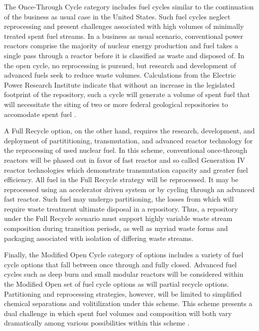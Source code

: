 The Once-Through Cycle category includes fuel cycles similar to the 
continuation of the business as usual case in the United States.
Such fuel cycles neglect reprocessing and present challenges 
associated with high volumes of minimally treated spent fuel streams.  
In a business as usual scenario, 
conventional power reactors comprise the majority of nuclear energy 
production and fuel takes a single pass through a reactor before it is 
classified as waste and disposed of. In the open cycle, no 
reprocessing is pursued, but research and development of advanced 
fuels seek to reduce waste volumes. Calculations from the Electric 
Power Research Institute indicate that without an increase in the legislated 
footprint of the repository, such a cycle will generate a 
volume of spent fuel that will necessitate the siting of two or more 
federal  geological repositories to accomodate spent fuel 
\cite{kessler_room_2006}.  %

A Full Recycle option, on the other hand, requires the research, 
development, and deployment of partititioning, transmutation, and 
advanced reactor technology for the reprocessing of used nuclear fuel.  
In this scheme, conventional once-through reactors will be phased out 
in favor of fast reactor and so called Generation IV reactor technologies which  
demonstrate transmutation capacity and greater fuel efficiency. All fuel in the 
Full Recycle strategy will be reprocessed. It may be reprocessed using  
an accelerator driven system or by cycling through an advanced fast 
reactor. Such fuel may undergo partitioning, the losses from which will 
require waste treatment ultimate disposal in a repository. Thus, a 
repository under the Full Recycle scenario must support highly 
variable waste stream composition during transition periods, as well as 
myriad waste forms and packaging associated with isolation of differing waste 
streams.

Finally, the Modified Open Cycle category of options includes a 
variety of fuel cycle options that fall between once through and fully 
closed. Advanced fuel cycles such as deep burn and small modular 
reactors will be considered within the Modified Open set of fuel cycle 
options as will partial recycle options. Partitioning and reprocessing 
strategies, however, will be limited to simplified chemical 
separations and volitilization under this scheme. This scheme presents
a dual challenge in which spent fuel volumes and composition will both 
vary dramatically among various possibilities within this scheme 
\cite{doe_nuclear_2010} .

